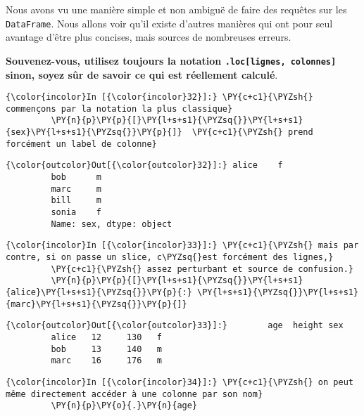     Nous avons vu une manière simple et non ambiguë de faire des requêtes
sur les \texttt{DataFrame}. Nous allons voir qu'il existe d'autres
manières qui ont pour seul avantage d'être plus concises, mais sources
de nombreuses erreurs.

\textbf{Souvenez-vous, utilisez toujours la notation
\texttt{.loc{[}lignes,\ colonnes{]}} sinon, soyez sûr de savoir ce qui
est réellement calculé}.

    \begin{Verbatim}[commandchars=\\\{\},frame=single,framerule=0.3mm,rulecolor=\color{cellframecolor}]
{\color{incolor}In [{\color{incolor}32}]:} \PY{c+c1}{\PYZsh{} commençons par la notation la plus classique}
         \PY{n}{p}\PY{p}{[}\PY{l+s+s1}{\PYZsq{}}\PY{l+s+s1}{sex}\PY{l+s+s1}{\PYZsq{}}\PY{p}{]}  \PY{c+c1}{\PYZsh{} prend forcément un label de colonne}
\end{Verbatim}


\begin{Verbatim}[commandchars=\\\{\},frame=single,framerule=0.3mm,rulecolor=\color{cellframecolor}]
{\color{outcolor}Out[{\color{outcolor}32}]:} alice    f
         bob      m
         marc     m
         bill     m
         sonia    f
         Name: sex, dtype: object
\end{Verbatim}
            
    \begin{Verbatim}[commandchars=\\\{\},frame=single,framerule=0.3mm,rulecolor=\color{cellframecolor}]
{\color{incolor}In [{\color{incolor}33}]:} \PY{c+c1}{\PYZsh{} mais par contre, si on passe un slice, c\PYZsq{}est forcément des lignes,}
         \PY{c+c1}{\PYZsh{} assez perturbant et source de confusion.}
         \PY{n}{p}\PY{p}{[}\PY{l+s+s1}{\PYZsq{}}\PY{l+s+s1}{alice}\PY{l+s+s1}{\PYZsq{}}\PY{p}{:} \PY{l+s+s1}{\PYZsq{}}\PY{l+s+s1}{marc}\PY{l+s+s1}{\PYZsq{}}\PY{p}{]}
\end{Verbatim}


\begin{Verbatim}[commandchars=\\\{\},frame=single,framerule=0.3mm,rulecolor=\color{cellframecolor}]
{\color{outcolor}Out[{\color{outcolor}33}]:}        age  height sex
         alice   12     130   f
         bob     13     140   m
         marc    16     176   m
\end{Verbatim}
            
    \begin{Verbatim}[commandchars=\\\{\},frame=single,framerule=0.3mm,rulecolor=\color{cellframecolor}]
{\color{incolor}In [{\color{incolor}34}]:} \PY{c+c1}{\PYZsh{} on peut même directement accéder à une colonne par son nom}
         \PY{n}{p}\PY{o}{.}\PY{n}{age}
\end{Verbatim}


